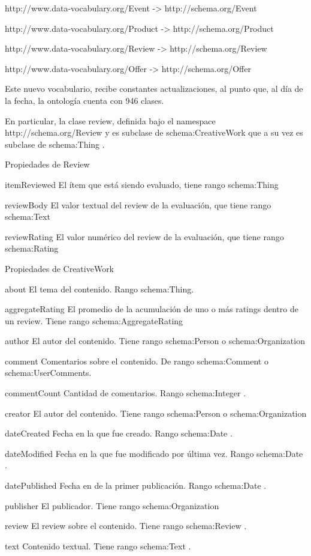 http://www.data-vocabulary.org/Event -> http://schema.org/Event

http://www.data-vocabulary.org/Product -> http://schema.org/Product

http://www.data-vocabulary.org/Review -> http://schema.org/Review

http://www.data-vocabulary.org/Offer -> http://schema.org/Offer

Este nuevo vocabulario, recibe constantes actualizaciones, al punto que, al día de la fecha, la ontología cuenta con 946 clases. 

En particular, la clase review, definida bajo el namespace http://schema.org/Review y es subclase de schema:CreativeWork 
que a su vez es subclase de schema:Thing .

Propiedades de Review

itemReviewed	El ítem que está siendo evaluado, tiene rango schema:Thing 

reviewBody 	El valor textual del review de la evaluación, que tiene rango schema:Text 

reviewRating 	El valor numérico del review de la evaluación, que tiene rango schema:Rating 


Propiedades de CreativeWork 

about 	El tema del contenido. Rango schema:Thing. 

aggregateRating 	El promedio de la acumulación de uno o más ratings dentro de un review. Tiene rango schema:AggregateRating 

author 	El autor del contenido. Tiene rango schema:Person o schema:Organization

comment 	Comentarios sobre el contenido. De rango schema:Comment o schema:UserComments.

commentCount 	Cantidad de comentarios. Rango schema:Integer . 

creator 	El autor del contenido. Tiene rango schema:Person o schema:Organization

dateCreated 	Fecha en la que fue creado. Rango schema:Date .

dateModified 	Fecha en la que fue modificado por última vez. Rango schema:Date .

datePublished 	Fecha en de la primer publicación. Rango schema:Date .

publisher 	El publicador. Tiene rango schema:Organization

review 	 	El review sobre el contenido. Tiene rango schema:Review .

text 		Contenido textual. Tiene rango schema:Text .


